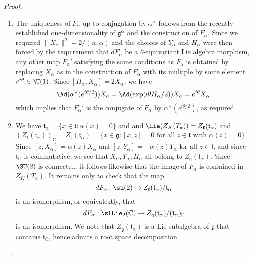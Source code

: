 \documentclass[reqno]{amsart} 
\begin{document}
\begin{proof}
\begin{enumerate}
  \item The uniqueness of $F_\alpha$ up to conjugation by $\alpha^\vee$ follows from the recently established one-dimensionality of $\mathfrak{g}^\alpha$ and the construction of $F_\alpha$.  Since we required $\|X_\alpha \|^2 = 2/(\alpha,\alpha)$ and the choices of $Y_\alpha$ and $H_\alpha$ were then forced by the requirement that $d F_\alpha$ be a $\theta$-equivariant Lie algebra morphism, any other map $F_\alpha '$ satisfying the same conditions as $F_\alpha$ is obtained by replacing $X_\alpha$ as in the construction of $F_\alpha$ with its multiple by some element $e^{i \theta} \in \U(1)$.  Since $[H_\alpha, X_\alpha] = 2 X_\alpha$, we have
    \begin{equation*}
      \Ad(\alpha^\vee(e^{i \theta/2}))
      X_\alpha 
      =
      \Ad(\exp(i \theta H_\alpha/2))
      X_\alpha
      =
      e^{i \theta} X_\alpha,
    \end{equation*}
    which implies that $F_\alpha '$ is the conjugate of $F_\alpha$ by $\alpha^\vee(e^{i \theta/2})$, as required.
  \item We have $\mathfrak{t}_{\alpha} = \{x \in \mathfrak{t} : \alpha(x) =0\}$ and and $\Lie(Z_K(T_\alpha)) = Z_{\mathfrak{k}}(\mathfrak{t}_\alpha)$ and $(Z_{\mathfrak{k}}(\mathfrak{t}_\alpha))_{\mathbb{C}} = Z_{\mathfrak{g}}(\mathfrak{t}_\alpha) = \{x \in \mathfrak{g} : [x,z] = 0 \text{ for all } z \in \mathfrak{t} \text{ with } \alpha(z) = 0\}$.  Since $[z,X_\alpha] = \alpha(z) X_\alpha$ and $[z,Y_\alpha] = -\alpha(z) Y_\alpha$ for all $z \in \mathfrak{t}$, and since $\mathfrak{t}_{\mathbb{C}}$ is commutative, we see that $X_\alpha, Y_\alpha, H_\alpha$ all belong to $Z_{\mathfrak{g}}(\mathfrak{t}_\alpha)$.  Since $\SU(2)$ is connected, it follows likewise that the image of $F_\alpha$ is contained in $Z_K(T_\alpha)$.  It remains only to check that the map
    \begin{equation*}
      d F_\alpha : \su(2) \rightarrow Z_{\mathfrak{k}}(\mathfrak{t}_\alpha)/\mathfrak{t}_\alpha
    \end{equation*}
    is an isomorphism, or equivalently, that
    \begin{equation}\label{eq:required-lie-alg-isom-involving-F-alpha}
      d F_\alpha : \slLie_2(\mathbb{C}) \rightarrow
      Z_{\mathfrak{g}}(\mathfrak{t}_\alpha)
      / (\mathfrak{t}_{\alpha})_{\mathbb{C}}
    \end{equation}
    is an isomorphism.  We note that $Z_{\mathfrak{g}}(\mathfrak{t}_\alpha)$ is a Lie subalgebra of $\mathfrak{g}$ that contains $\mathfrak{t}_{\mathbb{C}}$, hence admits a root space decomposition

\end{enumerate}
\end{proof}
\end{document}

